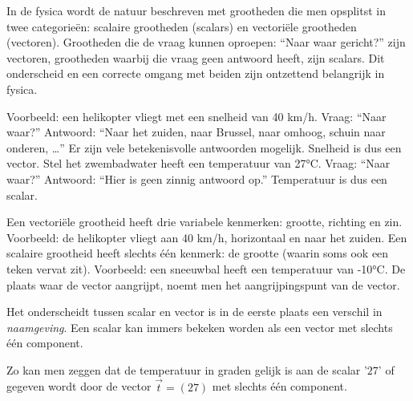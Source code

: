 \documentclass{ximera}
\begin{document}
	\author{Bart Lambregs}
    \xmsource\xmuitleg


In de fysica wordt de natuur beschreven met grootheden die men opsplitst in twee categorieën: scalaire grootheden (scalars) en vectoriële grootheden (vectoren). 
Grootheden die de vraag kunnen oproepen: “Naar waar gericht?” zijn vectoren, grootheden waarbij die vraag geen antwoord heeft, zijn scalars. 
Dit onderscheid en een correcte omgang met beiden zijn ontzettend belangrijk in fysica.


Voorbeeld: een helikopter vliegt met een snelheid van 40 km/h. 
Vraag: “Naar waar?” Antwoord: “Naar het zuiden, naar Brussel, naar omhoog, schuin naar onderen, …” 
Er zijn vele betekenisvolle antwoorden mogelijk. 
Snelheid is dus een vector. 
Stel het zwembadwater heeft een temperatuur van 27°C. 
Vraag: “Naar waar?” Antwoord: “Hier is geen zinnig antwoord op.” 
Temperatuur is dus een scalar.

Een vectoriële grootheid heeft drie variabele kenmerken: grootte, richting en zin. %
Voorbeeld: de helikopter vliegt aan 40 km/h, horizontaal en naar het zuiden. %
Een scalaire grootheid heeft slechts één kenmerk: de grootte (waarin soms ook een teken vervat zit). 
Voorbeeld: een sneeuwbal heeft een temperatuur van -10°C.
De plaats waar de vector aangrijpt, noemt men het aangrijpingspunt van de vector. %


\begin{remark}
Het onderscheidt tussen scalar en vector is in de eerste plaats een verschil in \textit{naamgeving}.
Een scalar kan immers bekeken worden als een vector met slechts één component.

Zo kan men zeggen dat de temperatuur in graden gelijk is aan de scalar '\(27\)' of gegeven wordt door de vector \(\vec{t} = (27) \) met slechts één component. 
\end{remark}




	
\end{document}
